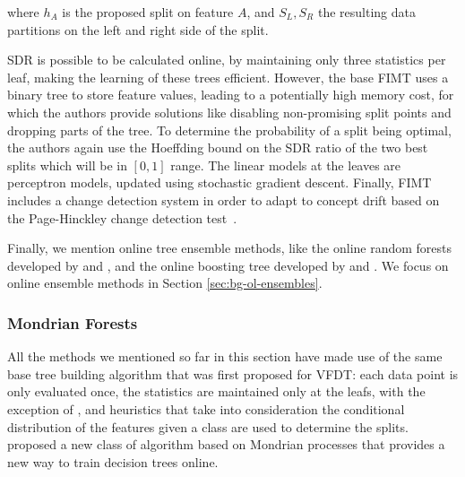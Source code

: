 \noindent
where $h_A$ is the proposed split on feature $A$, and $S_L, S_R$ the resulting
data partitions on the left and right side of the split.

SDR is possible to be calculated online, by maintaining only three statistics per leaf,
making the learning of these trees efficient. However, the base FIMT uses a binary tree
to store feature values, leading to a potentially high memory cost, for which
the authors provide solutions like disabling non-promising split points and dropping
parts of the tree. To determine the
probability of a split being optimal, the authors again use the Hoeffding bound
on the SDR ratio of the two best splits which will be in $[0, 1]$ range.
The linear models at the leaves are perceptron models, updated using stochastic
gradient descent.  Finally, FIMT includes a change detection system in order to
adapt to concept drift
based on the Page-Hinckley change detection test~\cite{ph-test, ph-test2}.

Finally, we mention online tree ensemble methods, like the online
random forests developed by \citet{Saffari2009onlineRF} and \citet{Gomes2017},
and the online boosting tree developed by \citet{online-gradient-boosting} and
\citet{online-boost-cv-7}. We focus on online ensemble methods in Section \ref{sec:bg-ol-ensembles}.

\subsubsection*{Mondrian Forests}

All the methods we mentioned so far in this section have made use of the same base tree building
algorithm that was first proposed for VFDT: each data point is only evaluated once,
the statistics are maintained only at the leafs, with the exception of \cite{efdt},
and heuristics that take into consideration the conditional distribution of the
features given a class are used to determine the splits. \citet{mondrian-forests-original}
proposed a new class of algorithm based on Mondrian processes \cite{mondrian-process}
that provides a new way to train decision trees online.

